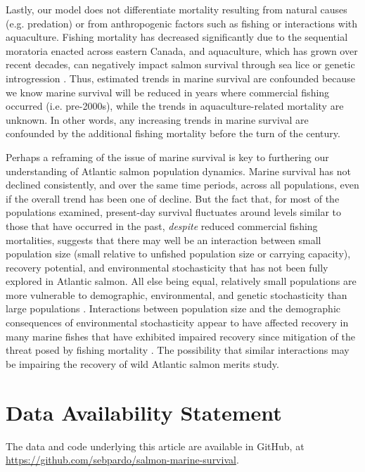 \documentclass[12pt]{article}
\begin{document}
Lastly, our model does not differentiate mortality resulting from natural
causes (e.g. predation) or from anthropogenic factors such as fishing or
interactions with aquaculture. Fishing mortality has decreased
significantly due to the sequential moratoria enacted across eastern Canada, and
aquaculture, which has grown over recent decades, can negatively impact salmon survival through sea lice
\citep{Shephard2020,Bohn2020} or genetic introgression \citep{Glover2017,Vollset2020}.
Thus, estimated trends in marine survival are confounded because we know marine
survival will be reduced in years where commercial fishing occurred (i.e.
pre-2000s), while the trends in aquaculture-related mortality are unknown.
In other words, any increasing trends in marine survival are confounded by the additional
fishing mortality before the turn of the century.

Perhaps a reframing of the issue of marine survival is key to furthering our
understanding of Atlantic salmon population dynamics. Marine survival has not
declined consistently, and over the same time periods, across all
populations, even if the overall trend has been one of decline.
But the fact that, for most of the populations examined,
present-day survival fluctuates around levels similar to those that have occurred in the past,
\emph{despite} reduced commercial fishing mortalities, suggests
that there may well be an interaction between small population size (small
relative to unfished population size or carrying capacity), recovery
potential, and environmental stochasticity that has not been fully explored in
Atlantic salmon.
All else being equal, relatively small populations are more vulnerable to
demographic, environmental, and genetic stochasticity than large populations
\citep{Lande1993, Hutchings2015}. Interactions between population size and the
demographic consequences of environmental stochasticity appear to have
affected recovery in many marine fishes that have exhibited impaired recovery
since mitigation of the threat posed by fishing mortality
\citep{Hutchings2017, Hutchings2020}. The possibility that similar
interactions may be impairing the recovery of wild Atlantic salmon merits
study.

\section*{Data Availability Statement}

The data and code underlying this article are available in GitHub, at \url{https://github.com/sebpardo/salmon-marine-survival}.
\end{document}
